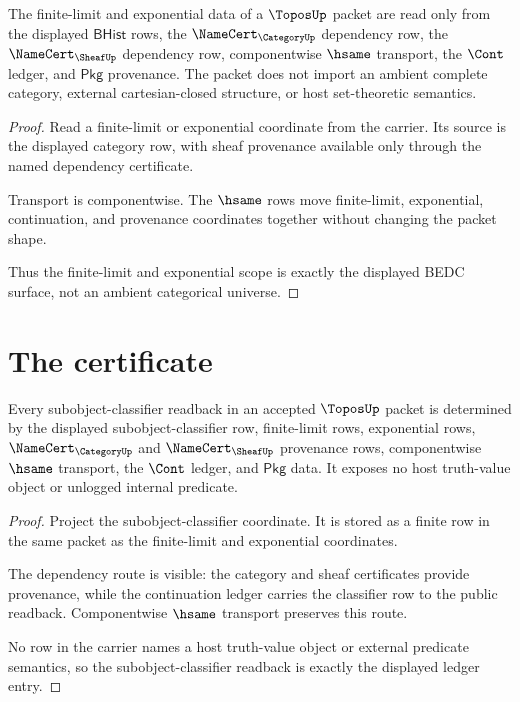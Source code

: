 \begin{theorem}
\label{thm:topos-finite-limit-exponential-scope}
The finite-limit and exponential data of a $\ToposUp$ packet are read only from the displayed $\mathsf{BHist}$ rows, the $\NameCert_{\CategoryUp}$ dependency row, the $\NameCert_{\SheafUp}$ dependency row, componentwise $\hsame$ transport, the $\Cont$ ledger, and $\mathsf{Pkg}$ provenance. The packet does not import an ambient complete category, external cartesian-closed structure, or host set-theoretic semantics.
\end{theorem}
\begin{proof}
Read a finite-limit or exponential coordinate from the carrier. Its source is the displayed category row, with sheaf provenance available only through the named dependency certificate.

Transport is componentwise. The $\hsame$ rows move finite-limit, exponential, continuation, and provenance coordinates together without changing the packet shape.

Thus the finite-limit and exponential scope is exactly the displayed BEDC surface, not an ambient categorical universe.
\end{proof}

\section{The certificate}
\label{sec:topos-certificate}

\begin{theorem}
\label{thm:topos-subobject-classifier-ledger-exactness}
Every subobject-classifier readback in an accepted $\ToposUp$ packet is determined by the displayed subobject-classifier row, finite-limit rows, exponential rows, $\NameCert_{\CategoryUp}$ and $\NameCert_{\SheafUp}$ provenance rows, componentwise $\hsame$ transport, the $\Cont$ ledger, and $\mathsf{Pkg}$ data. It exposes no host truth-value object or unlogged internal predicate.
\end{theorem}
\begin{proof}
Project the subobject-classifier coordinate. It is stored as a finite row in the same packet as the finite-limit and exponential coordinates.

The dependency route is visible: the category and sheaf certificates provide provenance, while the continuation ledger carries the classifier row to the public readback. Componentwise $\hsame$ transport preserves this route.

No row in the carrier names a host truth-value object or external predicate semantics, so the subobject-classifier readback is exactly the displayed ledger entry.
\end{proof}

